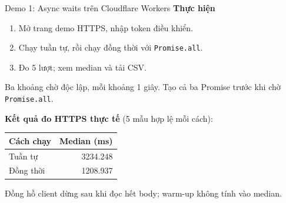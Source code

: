\begin{frame}{Demo 1: Async waits trên Cloudflare Workers}
  \textbf{Thực hiện}
  \begin{enumerate}
    \item Mở trang demo HTTPS, nhập token điều khiển.
    \item Chạy tuần tự, rồi chạy đồng thời với \texttt{Promise.all}.
    \item Đo 5 lượt; xem median và tải CSV.
  \end{enumerate}
  \medskip
  Ba khoảng chờ độc lập, mỗi khoảng 1 giây.
  Tạo cả ba Promise trước khi chờ \texttt{Promise.all}.
  \medskip

  \textbf{Kết quả đo HTTPS thực tế} (5 mẫu hợp lệ mỗi cách):
  \begin{center}
    \begin{tabular}{lr}
      Cách chạy & Median (ms) \\\hline
      Tuần tự & 3234.248 \\
      Đồng thời & 1208.937
    \end{tabular}
  \end{center}
  Đồng hồ client dừng sau khi đọc hết body; warm-up không tính vào median.
\end{frame}

